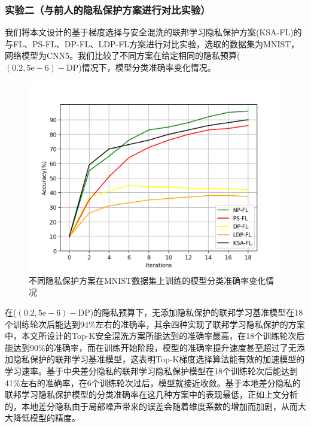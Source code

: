 \subsubsection{实验二（与前人的隐私保护方案进行对比实验）} 
我们将本文设计的基于梯度选择与安全混洗的联邦学习隐私保护方案(KSA-FL)的与FL、PS-FL、DP-FL、LDP-FL方案进行对比实验，选取的数据集为MNIST，网络模型为CNN5。我们比较了不同方案在给定相同的隐私预算($(0.2,5 \mathrm{e}-6)-\mathrm{DP}$)情况下，模型分类准确率变化情况。

\begin{figure}[!hbt]
\centering
  	\includegraphics[scale=0.6]{fig2/C4/实验二}%
	\caption{不同隐私保护方案在MNIST数据集上训练的模型分类准确率变化情况}
  	\label{fig:不同隐私保护方案在MNIST数据集上训练的模型分类准确率变化情况} 
\end{figure}

在($(0.2,5 \mathrm{e}-6)-\mathrm{DP}$)的隐私预算下，无添加隐私保护的联邦学习基准模型在18个训练轮次后能达到94\%左右的准确率，其余四种实现了联邦学习隐私保护的方案中，本文所设计的Top-K安全混洗方案所能达到的准确率最高，在18个训练轮次后能达到90\%的准确率，而在训练开始阶段，模型的准确率提升速度甚至超过了无添加隐私保护的联邦学习基准模型，这表明Top-K梯度选择算法能有效的加速模型的学习速率。基于中央差分隐私的联邦学习隐私保护模型在18个训练轮次后能达到41\%左右的准确率，在6个训练轮次过后，模型就接近收敛。基于本地差分隐私的联邦学习隐私保护模型的分类准确率在这几种方案中的表现最低，正如上文分析的，本地差分隐私由于局部噪声带来的误差会随着维度系数的增加而加剧，从而大大降低模型的精度。

